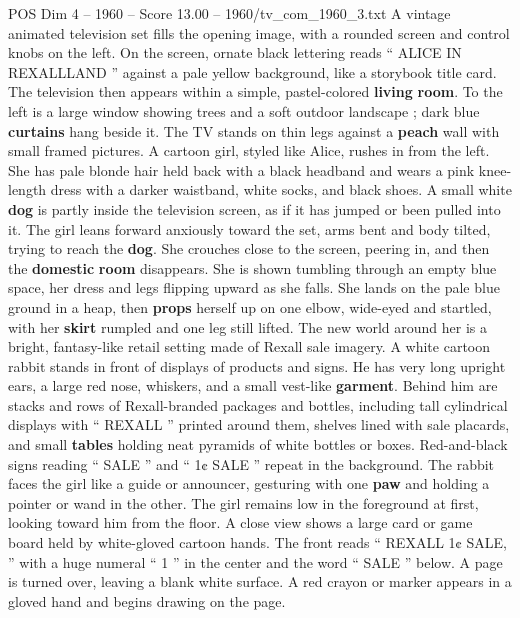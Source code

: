 \begin{textsample}{POS Dim 4 – 1960 – Score 13.00 – 1960/tv\_com\_1960\_3.txt}  \label{ex:f4_pos_067}
A vintage animated television set fills the opening image, with a rounded screen and control knobs on the left.
On the screen, ornate black lettering reads “ ALICE IN REXALLLAND ” against a pale yellow background, like a storybook title card.
The television then appears within a simple, pastel-colored \textbf{living} \textbf{room}.
To the left is a large window showing trees and a soft outdoor landscape ; dark blue \textbf{curtains} hang beside it.
The TV stands on thin legs against a \textbf{peach} wall with small framed pictures.
A cartoon girl, styled like Alice, rushes in from the left.
She has pale blonde hair held back with a black headband and wears a pink knee-length dress with a darker waistband, white socks, and black shoes.
A small white \textbf{dog} is partly inside the television screen, as if it has jumped or been pulled into it.
The girl leans forward anxiously toward the set, arms bent and body tilted, trying to reach the \textbf{dog}.
She crouches close to the screen, peering in, and then the \textbf{domestic} \textbf{room} disappears.
She is shown tumbling through an empty blue space, her dress and legs flipping upward as she falls.
She lands on the pale blue ground in a heap, then \textbf{props} herself up on one elbow, wide-eyed and startled, with her \textbf{skirt} rumpled and one leg still lifted.
The new world around her is a bright, fantasy-like retail setting made of Rexall sale imagery.
A white cartoon rabbit stands in front of displays of products and signs.
He has very long upright ears, a large red nose, whiskers, and a small vest-like \textbf{garment}.
Behind him are stacks and rows of Rexall-branded packages and bottles, including tall cylindrical displays with “ REXALL ” printed around them, shelves lined with sale placards, and small \textbf{tables} holding neat pyramids of white bottles or boxes.
Red-and-black signs reading “ SALE ” and “ 1¢ SALE ” repeat in the background.
The rabbit faces the girl like a guide or announcer, gesturing with one \textbf{paw} and holding a pointer or wand in the other.
The girl remains low in the foreground at first, looking toward him from the floor.
A close view shows a large card or game board held by white-gloved cartoon hands.
The front reads “ REXALL 1¢ SALE, ” with a huge numeral “ 1 ” in the center and the word “ SALE ” below.
A page is turned over, leaving a blank white surface.
A red crayon or marker appears in a gloved hand and begins drawing on the page.

\end{textsample}
